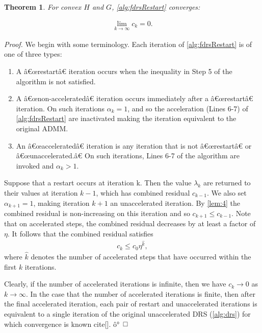 \documentclass[11pt]{article}
\newtheorem{thrm}{Theorem}
\begin{document}
\begin{thrm}
For convex $H$ and $G$, \cref{alg:fdrsRestart} converges:

\begin{align}
\lim_{k\rightarrow \infty} c_k = 0.
\end{align}
\end{thrm}
\begin{proof}
We begin with some terminology. Each iteration of
\cref{alg:fdrsRestart} is of one of three types: 

\begin{enumerate}
\item A â€œrestartâ€ iteration occurs when the inequality in Step 5 of
  the algorithm is not satisfied.
\item A â€œnon-acceleratedâ€ iteration occurs immediately after
a â€œrestartâ€ iteration. On such iterations $\alpha_k = 1$, and so the
acceleration (Lines 6-7) of \cref{alg:fdrsRestart} are inactivated making the
iteration equivalent to the original ADMM. 
\item An â€œacceleratedâ€ iteration is any iteration that is not
  â€œrestartâ€ or â€œunaccelerated.â€  On such iterations, Lines 6-7 of the
  algorithm are invoked and $\alpha_k > 1$.  
\end{enumerate}
Suppose that a restart occurs at iteration k. Then the value
$\lambda_k$ are returned to their values at iteration $k-1$, which has
combined residual $c_{k-1}$. We also set $\alpha_{k+1} = 1$, making
iteration $k + 1$ an unaccelerated iteration.  By \cref{lem:4} the
combined residual is non-increasing on this iteration and so $c_{k+1}
\le c_{k-1}$.  Note that on accelerated steps, the combined residual
decreases by at least a factor of $\eta$. It follows that the combined
residual satisfies 
\begin{align}
c_k \le c_0\eta^{\hat k},
\end{align} 
\noindent where $\hat k$ denotes the number of accelerated steps that
have occurred within the first $k$ iterations.  

Clearly, if the number of accelerated iterations is infinite, then we
have $c_k \rightarrow 0$ as $k \rightarrow \infty$. In the case that
the number of accelerated iterations is finite, then after the final
accelerated iteration, each pair of restart and unaccelerated
iterations is equivalent to a single iteration of the original
unaccelerated DRS (\cref{alg:drs}) for which convergence is known
cite[]. ô°
\end{proof}
\end{document}
